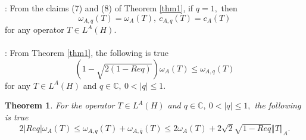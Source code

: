 \documentclass[preprint,12pt,3p]{elsarticle}
\newtheorem{theorem}{Theorem}
\begin{document}
: From the claims (7) and (8) of Theorem \ref{thm1}, if $ q=1, $ then
$$
\omega_{A,q}(T)=\omega_{A}(T), \ c_{A,q}(T)=c_{A}(T)
$$
for any operator $ T\in L^{A}(H). $ \\ \\
: From Theorem \ref{thm1}, the following is true
$$
(1-\sqrt{2(1-Req)})\omega_{A}(T)\leq \omega_{A,q}(T)
$$
for any $ T\in L^{A}(H) $ and $ q\in \mathbb{C}, \ 0<\vert q \vert\leq 1. $
\begin{theorem}\label{Thhm_2}
For the operator $ T\in L^{A}(H) $ and $ q\in \mathbb{C}, \ 0<\vert q \vert\leq 1, $ the following is true
$$
2\vert Re q \vert\omega_{A}(T) \leq \omega_{A,q}(T)+ \omega_{A,\overline{q}}(T) \leq 2 \omega_{A}(T) + 2\sqrt{2}\sqrt{1-Req} \Vert T \Vert_{A}.
$$
\end{theorem}
\end{document}
